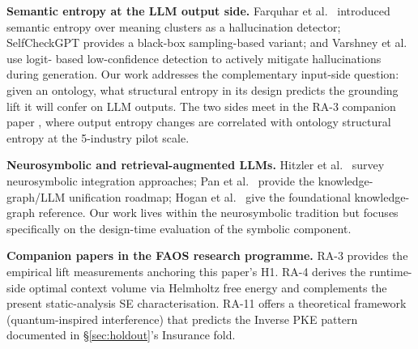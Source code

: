 \documentclass[11pt,a4paper]{article}
\newcommand{\faos}{\textsc{FAOS}}
\begin{document}
\textbf{Semantic entropy at the LLM output side.} Farquhar et al.\
\citep{farquhar2024semantic} introduced semantic entropy over meaning
clusters as a hallucination detector; SelfCheckGPT
\citep{manakul2023selfcheckgpt} provides a black-box sampling-based
variant; and Varshney et al.\ \citep{varshney2023stitch} use logit-%
based low-confidence detection to actively mitigate hallucinations
during generation. Our work addresses the complementary input-side
question: given an ontology, what structural entropy in its design
predicts the grounding lift it will confer on LLM outputs. The two
sides meet in the RA-3 companion paper \citep{luong2026neurosymbolic},
where output entropy changes are correlated with ontology structural
entropy at the 5-industry pilot scale.

\textbf{Neurosymbolic and retrieval-augmented LLMs.} Hitzler et al.\
\citep{hitzler2022neuro} survey neurosymbolic integration approaches;
Pan et al.\ \citep{pan2024unifying} provide the knowledge-graph/LLM
unification roadmap; Hogan et al.\ \citep{hogan2021knowledge} give the
foundational knowledge-graph reference. Our work lives within the
neurosymbolic tradition but focuses specifically on the design-time
evaluation of the symbolic component.

\textbf{Companion papers in the \faos{} research programme.} RA-3
\citep{luong2026neurosymbolic} provides the empirical lift
measurements anchoring this paper's H1. RA-4 \citep{luong2026context}
derives the runtime-side optimal context volume via Helmholtz free
energy and complements the present static-analysis SE characterisation.
RA-11 \citep{luong2026quantum} offers a theoretical framework
(quantum-inspired interference) that predicts the Inverse PKE pattern
documented in \S\ref{sec:holdout}'s Insurance fold.
\end{document}
